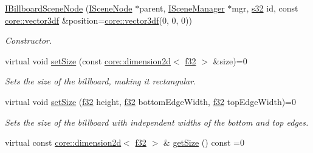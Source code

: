 \begin{DoxyCompactItemize}
\mbox{\label{classirr_1_1scene_1_1IBillboardSceneNode_a32225fb98ab8f9e472272ae9e83c3c88}} 
\hyperlink{classirr_1_1scene_1_1IBillboardSceneNode_a32225fb98ab8f9e472272ae9e83c3c88}{I\+Billboard\+Scene\+Node} (\hyperlink{classirr_1_1scene_1_1ISceneNode}{I\+Scene\+Node} $\ast$parent, \hyperlink{classirr_1_1scene_1_1ISceneManager}{I\+Scene\+Manager} $\ast$mgr, \hyperlink{namespaceirr_ac66849b7a6ed16e30ebede579f9b47c6}{s32} id, const \hyperlink{namespaceirr_1_1core_ae6e2b2a6c552833ebbd5b7463d03586b}{core\+::vector3df} \&position=\hyperlink{namespaceirr_1_1core_ae6e2b2a6c552833ebbd5b7463d03586b}{core\+::vector3df}(0, 0, 0))
\begin{DoxyCompactList}\small\item\em Constructor. \end{DoxyCompactList}\item 
\mbox{\label{classirr_1_1scene_1_1IBillboardSceneNode_a911415ac24440bd3ccfcde102583fd60}} 
virtual void \hyperlink{classirr_1_1scene_1_1IBillboardSceneNode_a911415ac24440bd3ccfcde102583fd60}{set\+Size} (const \hyperlink{classirr_1_1core_1_1dimension2d}{core\+::dimension2d}$<$ \hyperlink{namespaceirr_a0277be98d67dc26ff93b1a6a1d086b07}{f32} $>$ \&size)=0
\begin{DoxyCompactList}\small\item\em Sets the size of the billboard, making it rectangular. \end{DoxyCompactList}\item 
virtual void \hyperlink{classirr_1_1scene_1_1IBillboardSceneNode_a9a5d47a00bb0160daab8fa53453a2ba4}{set\+Size} (\hyperlink{namespaceirr_a0277be98d67dc26ff93b1a6a1d086b07}{f32} height, \hyperlink{namespaceirr_a0277be98d67dc26ff93b1a6a1d086b07}{f32} bottom\+Edge\+Width, \hyperlink{namespaceirr_a0277be98d67dc26ff93b1a6a1d086b07}{f32} top\+Edge\+Width)=0
\begin{DoxyCompactList}\small\item\em Sets the size of the billboard with independent widths of the bottom and top edges. \end{DoxyCompactList}\item 
virtual const \hyperlink{classirr_1_1core_1_1dimension2d}{core\+::dimension2d}$<$ \hyperlink{namespaceirr_a0277be98d67dc26ff93b1a6a1d086b07}{f32} $>$ \& \hyperlink{classirr_1_1scene_1_1IBillboardSceneNode_a466cfd24ccb0fb6c2216dbdc7228e3c0}{get\+Size} () const =0

\end{DoxyCompactItemize}
